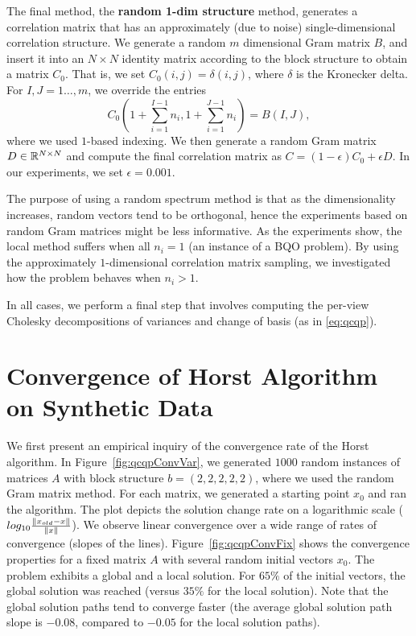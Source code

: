 The final method, the \textbf{random 1-dim structure} method,
generates a correlation matrix that has an approximately (due to
noise) single-dimensional correlation structure. We
generate a random $m$ dimensional Gram matrix $B$, and insert
it into an $N\times N$ identity matrix according to the block
structure to obtain a matrix $C_0$. That is, we set $C_0\left(i,j\right) = \delta\left(i,j\right)$,
where $\delta$ is the Kronecker delta. For $I,J = 1\ldots,m$, we
override the entries $$C_0\left(1+ \sum_{i=1}^{I-1}n_i, 1+
\sum_{i=1}^{J-1}n_i\right) = B\left(I,J\right),$$ where we used $1$-based
indexing. We then generate a random Gram matrix $D \in
\mathbb{R}^{N\times N}$ and compute the final correlation matrix as $C
= \left(1- \epsilon\right)C_0 + \epsilon D$.
In our experiments, we set $\epsilon = 0.001$.

The purpose of using a random spectrum method
is that as the dimensionality increases, random vectors tend to
be orthogonal, hence the experiments based on random Gram
matrices might be less informative. As the experiments show, the
local method suffers  when all $n_i = 1$ (an instance of a BQO problem). 
By using the approximately $1$-dimensional correlation matrix sampling, 
we investigated how the problem behaves when $n_i > 1$.

In all cases, we perform a final step that involves computing the
per-view Cholesky decompositions of variances and change of basis
(as in \ref{eq:qcqp}).

\section{Convergence of Horst Algorithm on Synthetic Data}\label{chap:experiments:horst}

We first present an empirical inquiry of the convergence rate of the
Horst algorithm. In Figure~\ref{fig:qcqpConvVar}, we
generated $1000$ random  instances of matrices $A$ with block
structure $b = \left(2,2,2,2,2\right)$, where we used 
the random Gram matrix method. For each matrix, we generated
a starting point $x_0$ and ran the algorithm. The plot depicts the
solution change rate on a logarithmic scale ($log_{10}
\frac{\lVert x_{old} - x\rVert}{\lVert x\rVert}$). We observe linear convergence
over a wide range of rates of convergence (slopes of the
lines). Figure~\ref{fig:qcqpConvFix} shows the convergence properties
for a fixed matrix $A$ with several random initial vectors $x_0$. The
problem exhibits a global and a local solution. For $65\%$ of the initial vectors, 
the global solution was reached (versus $35\%$ for the local solution). Note that the global
solution paths tend to converge faster (the average global solution path slope 
is  $-0.08$, compared  to $-0.05$ for the local solution paths).


